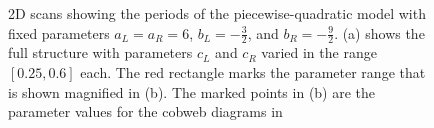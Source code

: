 \begin{figure}
	\centering
	\caption[2D scans showing periods of the even piecewise quadratic model]{
		2D scans showing the periods of the piecewise-quadratic model with fixed parameters $a_L = a_R = 6$, $b_L = -\frac{3}{2}$, and $b_R = -\frac{9}{2}$.
		(a) shows the full structure with parameters $c_L$ and $c_R$ varied in the range $[0.25, 0.6]$ each.
		The red rectangle marks the parameter range that is shown magnified in (b).
		The marked points in (b) are the parameter values for the cobweb diagrams in 
	}
\end{figure}

